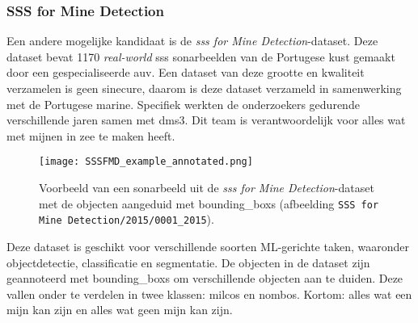\subsubsection{SSS for Mine Detection}

Een andere mogelijke kandidaat is de \emph{\acrshort{sss} for Mine Detection}-dataset. Deze dataset bevat 1170 \emph{real-world} \gls{sss} sonarbeelden van de Portugese kust gemaakt door een gespecialiseerde \gls{auv}. Een dataset van deze grootte en kwaliteit verzamelen is geen sinecure, daarom is deze dataset verzameld in samenwerking met de Portugese marine. Specifiek werkten de onderzoekers gedurende verschillende jaren samen met \gls{dms3}. Dit team is verantwoordelijk voor alles wat met mijnen in zee te maken heeft. \autocite{Pessanha_Santos_2024}

\begin{figure}[H]
    \centering
    \texttt{[image: SSSFMD\_example\_annotated.png]}
    \caption[SSS for Mine Detection-afbeelding met bounding boxes.]{\label{fig:sssfmd_image}Voorbeeld van een sonarbeeld uit de \emph{\gls{sss} for Mine Detection}-dataset met de objecten aangeduid met \glspl{bounding_box} (afbeelding \texttt{SSS for Mine Detection/2015/0001\_2015}). \autocite{Pessanha_Santos_2024_SSSFMD}}
\end{figure}

Deze dataset is geschikt voor verschillende soorten ML-gerichte taken, waaronder objectdetectie, classificatie en segmentatie. De objecten in de dataset zijn geannoteerd met \glspl{bounding_box} om verschillende objecten aan te duiden. Deze vallen onder te verdelen in twee klassen: \glspl{milco} en \glspl{nombo}. Kortom: alles wat een mijn kan zijn en alles wat geen mijn kan zijn.

